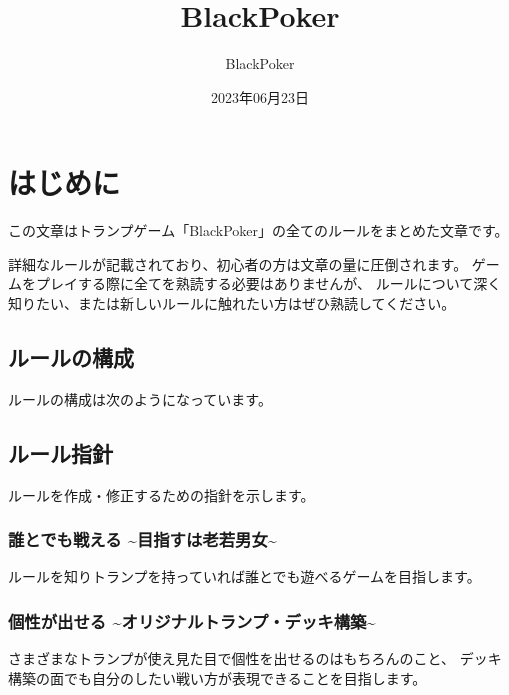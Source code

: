 \documentclass[letterpaper,10pt,dvipdfmx]{sphinxmanual}
\title{BlackPoker}
\date{2023年06月23日}
\author{BlackPoker}
\begin{document}
\pagestyle{empty}
\sphinxmaketitle
\pagestyle{plain}
\sphinxtableofcontents
\pagestyle{normal}
\label{\detokenize{index::doc}}
\ignorespaces 


\sphinxstepscope


\chapter{はじめに}
\label{\detokenize{init/init:id1}}\label{\detokenize{init/init::doc}}
\sphinxAtStartPar
この文章はトランプゲーム「BlackPoker」の全てのルールをまとめた文章です。

\sphinxAtStartPar
詳細なルールが記載されており、初心者の方は文章の量に圧倒されます。
ゲームをプレイする際に全てを熟読する必要はありませんが、
ルールについて深く知りたい、または新しいルールに触れたい方はぜひ熟読してください。


\section{ルールの構成}
\label{\detokenize{init/init:id2}}
\sphinxAtStartPar
ルールの構成は次のようになっています。

\noindent{}


\section{ルール指針}
\label{\detokenize{init/init:id3}}
\sphinxAtStartPar
ルールを作成・修正するための指針を示します。


\subsection{誰とでも戦える \textasciitilde{}目指すは老若男女\textasciitilde{}}
\label{\detokenize{init/init:id4}}
\sphinxAtStartPar
ルールを知りトランプを持っていれば誰とでも遊べるゲームを目指します。


\subsection{個性が出せる \textasciitilde{}オリジナルトランプ・デッキ構築\textasciitilde{}}
\label{\detokenize{init/init:id5}}
\sphinxAtStartPar
さまざまなトランプが使え見た目で個性を出せるのはもちろんのこと、
デッキ構築の面でも自分のしたい戦い方が表現できることを目指します。
\end{document}
